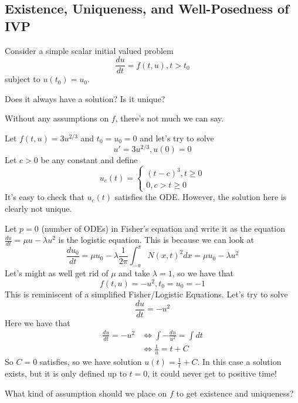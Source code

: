 \documentclass{article}
\begin{document}
\subsection{Existence, Uniqueness, and Well-Posedness of IVP}
Consider a simple scalar initial valued problem
\[\frac{du}{dt} = f(t, u), t > t_0\]
subject to $u(t_0) = u_0$.

\begin{question}
    Does it always have a solution? Is it unique?
\end{question}

Without any assumptions on $f$, there's not much we can say.
\begin{example}
    Let $f(t, u) = 3 u^{2/3}$ and $t_0 = u_0 = 0$ and let's try to solve
    \[u' = 3 u^{2/3}, u(0) = 0\]
    Let $c > 0$ be any constant and define
    \[u_c(t) = \begin{cases}
        (t - c)^3, t \geq 0\\
        0, c > t \geq 0
    \end{cases}\]
    It's easy to check that $u_c(t)$ satisfies the ODE. However, the solution here is clearly not unique.
\end{example}

\begin{example}
    Let $p = 0$ (number of ODEs) in Fisher's equation and write it as the equation $\frac{du}{dt} = \mu u - \lambda u^2$ is the logistic equation. This is because we can look at 
    \[\frac{du_0}{dt} = \mu u_0 - \lambda \frac{1}{2\pi} \int_{-\pi}^{\pi} N(x, t)^2 dx = \mu u_0 - \lambda u^2\]
    Let's might as well get rid of $\mu$ and take $\lambda = 1$, so we have that
    \[f(t, u) = - u^2, t_0 = u_0 = -1\]
    This is reminiscent of a simplified Fisher/Logistic Equations. Let's try to solve
    \[\frac{du}{dt} =  - u^2\]
    Here we have that
    \begin{align*}
        \frac{du}{dt} =  - u^2 &\iff \int -\frac{du}{u^2} = \int dt\\
        &\iff \frac{1}{u} = t + C
    \end{align*}
    So $C = 0$ satisfies, so we have solution $u(t) = \frac{1}{t} + C$. In this case a solution exists, but it is only defined up to $t = 0$, it could never get to positive time!
\end{example}

\begin{question}
    What kind of assumption should we place on $f$ to get existence and uniqueness?
\end{question}
\end{document}
